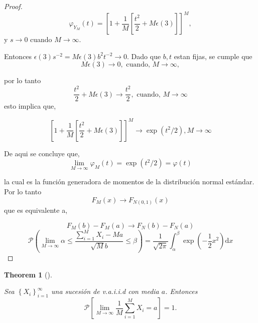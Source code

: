 \documentclass[
  letterpaper,
  DIV=11,
  numbers=noendperiod]{scrreprt}
\theoremstyle{definition}
\theoremstyle{plain}
\newtheorem{theorem}{Theorem}[chapter]
\theoremstyle{remark}
\begin{document}
\begin{proof}
\[
\varphi_{Y_M}\left(t\right)=\left[1+\dfrac{1}{M}\left[\dfrac{t^{2}}{2}+M\epsilon\left(3\right)\right]\right]^{M},
\] y \(s\to0\) cuando \(M\to\infty\).

Entonces
\(\epsilon\left(3\right)s^{-2}=M\epsilon\left(3\right)b^{2}t^{-2}\to0\).
Dado que \(b,t\) estan fijas, se cumple que \[
M\epsilon\left(3\right)\to0,\text{ cuando, }M\to\infty,
\]

por lo tanto \[
\dfrac{t^{2}}{2}+M\epsilon\left(3\right) \to\dfrac{t^{2}}{2},\text{ cuando, }M\to\infty
\] esto implica que,

\[
\left[1+\dfrac{1}{M}\left[\dfrac{t^{2}}{2}+M\epsilon\left(3\right)\right]\right]^{M} \to\exp\left(t^{2}/2\right),M\to\infty
\]

De aqui se concluye que, \[
\lim_{M\to\infty}\varphi_{M}\left(t\right)  =\exp\left(t^{2}/2\right)=\varphi\left(t\right)
\]

la cual es la función generadora de momentos de la distribución normal
estándar. Por lo tanto \[
F_{M}\left(x\right)\to F_{N\left(0,1\right)}\left(x\right)
\] que es equivalente a,

\[
F_{M}\left(b\right)-F_{M}\left(a\right)  \to F_{N}\left(b\right)-F_{N}\left(a\right)
\] \[
\mathcal{P}\left(\lim_{M\to\infty}\alpha\le\dfrac{{\displaystyle \sum_{i=1}^{M}}X_{i}-Ma}{\sqrt{M}b}\leq\beta\right) =\dfrac{1}{\sqrt{2\pi}}\int_{\alpha}^{\beta}\exp\left(-\dfrac{1}{2}x^{2}\right)\mathrm{d}x
\]

\end{proof}

\begin{theorem}[]\protect\hypertarget{thm-5.4}{}\label{thm-5.4}

Sea \(\left\{ X_{i}\right\} _{i=1}^{\infty}\) una sucesión de v.a.i.i.d
con media \(a\). Entonces \[
\mathcal{P}\left[\lim_{M\to\infty}\dfrac{1}{M}\sum_{i=1}^{M}X_{i}=a\right]=1.
\]

\end{theorem}
\end{document}

